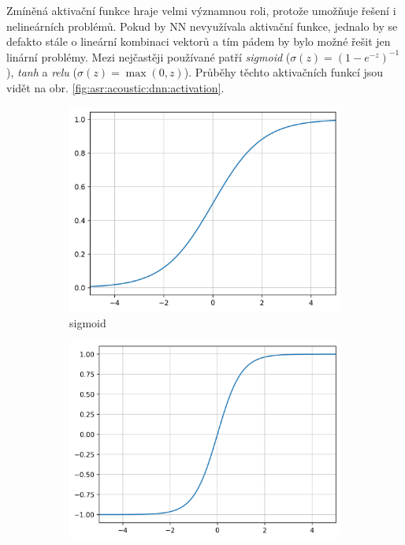 Zmíněná aktivační funkce hraje velmi významnou roli, protože umožňuje řešení i nelineárních problémů. Pokud by NN nevyužívala aktivační funkce, jednalo by se defakto stále o lineární kombinaci vektorů a tím pádem by bylo možné řešit jen linární problémy. Mezi nejčastěji používané patří \textit{sigmoid} ($\sigma\left(z\right) = \left(1 - e^{-z}\right)^{-1}$), \textit{tanh} a \textit{relu} ($\sigma\left(z\right) = \max\left(0, z\right)$). Průběhy těchto aktivačních funkcí jsou vidět na obr. \ref{fig:asr:acoustic:dnn:activation}.

 \begin{figure}[htpb]
  \centering
  \begin{subfigure}[b]{0.29\textwidth}
    \includegraphics[width=\textwidth]{./ch4-asr/img/sigmoid.png}
    \caption{sigmoid}
    \label{fig:asr:acoustic:dnn:activation:sigmoid}
  \end{subfigure}
  \begin{subfigure}[b]{0.3\textwidth}
    \includegraphics[width=\textwidth]{./ch4-asr/img/tanh.png}

\end{subfigure}
\end{figure}
